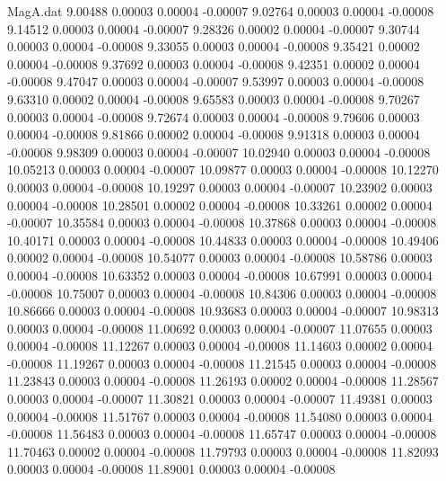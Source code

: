\begin{filecontents}{MagA.dat}
   9.00488    0.00003    0.00004   -0.00007
   9.02764    0.00003    0.00004   -0.00008
   9.14512    0.00003    0.00004   -0.00007
   9.28326    0.00002    0.00004   -0.00007
   9.30744    0.00003    0.00004   -0.00008
   9.33055    0.00003    0.00004   -0.00008
   9.35421    0.00002    0.00004   -0.00008
   9.37692    0.00003    0.00004   -0.00008
   9.42351    0.00002    0.00004   -0.00008
   9.47047    0.00003    0.00004   -0.00007
   9.53997    0.00003    0.00004   -0.00008
   9.63310    0.00002    0.00004   -0.00008
   9.65583    0.00003    0.00004   -0.00008
   9.70267    0.00003    0.00004   -0.00008
   9.72674    0.00003    0.00004   -0.00008
   9.79606    0.00003    0.00004   -0.00008
   9.81866    0.00002    0.00004   -0.00008
   9.91318    0.00003    0.00004   -0.00008
   9.98309    0.00003    0.00004   -0.00007
  10.02940    0.00003    0.00004   -0.00008
  10.05213    0.00003    0.00004   -0.00007
  10.09877    0.00003    0.00004   -0.00008
  10.12270    0.00003    0.00004   -0.00008
  10.19297    0.00003    0.00004   -0.00007
  10.23902    0.00003    0.00004   -0.00008
  10.28501    0.00002    0.00004   -0.00008
  10.33261    0.00002    0.00004   -0.00007
  10.35584    0.00003    0.00004   -0.00008
  10.37868    0.00003    0.00004   -0.00008
  10.40171    0.00003    0.00004   -0.00008
  10.44833    0.00003    0.00004   -0.00008
  10.49406    0.00002    0.00004   -0.00008
  10.54077    0.00003    0.00004   -0.00008
  10.58786    0.00003    0.00004   -0.00008
  10.63352    0.00003    0.00004   -0.00008
  10.67991    0.00003    0.00004   -0.00008
  10.75007    0.00003    0.00004   -0.00008
  10.84306    0.00003    0.00004   -0.00008
  10.86666    0.00003    0.00004   -0.00008
  10.93683    0.00003    0.00004   -0.00007
  10.98313    0.00003    0.00004   -0.00008
  11.00692    0.00003    0.00004   -0.00007
  11.07655    0.00003    0.00004   -0.00008
  11.12267    0.00003    0.00004   -0.00008
  11.14603    0.00002    0.00004   -0.00008
  11.19267    0.00003    0.00004   -0.00008
  11.21545    0.00003    0.00004   -0.00008
  11.23843    0.00003    0.00004   -0.00008
  11.26193    0.00002    0.00004   -0.00008
  11.28567    0.00003    0.00004   -0.00007
  11.30821    0.00003    0.00004   -0.00007
  11.49381    0.00003    0.00004   -0.00008
  11.51767    0.00003    0.00004   -0.00008
  11.54080    0.00003    0.00004   -0.00008
  11.56483    0.00003    0.00004   -0.00008
  11.65747    0.00003    0.00004   -0.00008
  11.70463    0.00002    0.00004   -0.00008
  11.79793    0.00003    0.00004   -0.00008
  11.82093    0.00003    0.00004   -0.00008
  11.89001    0.00003    0.00004   -0.00008

\end{filecontents}

